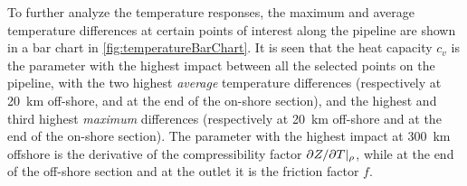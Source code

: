 
To further analyze the temperature responses, the maximum and average temperature differences at certain points of interest along the pipeline are shown in a bar chart in \cref{fig:temperatureBarChart}. %
It is seen that the heat capacity $c_v$ is the parameter with the highest impact between all the selected points on the pipeline, with the two highest \emph{average} temperature differences (respectively at \SI{20}{\kilo\meter} off-shore, and at the end of the on-shore section), and the highest and third highest \emph{maximum} differences (respectively at \SI{20}{\kilo\meter} off-shore and at the end of the on-shore section). The parameter with the highest impact at \SI{300}{\kilo\meter} offshore is the derivative of the compressibility factor $\partial Z/\partial T\/|_\rho$, while at the end of the off-shore section and at the outlet it is the friction factor $f$.



